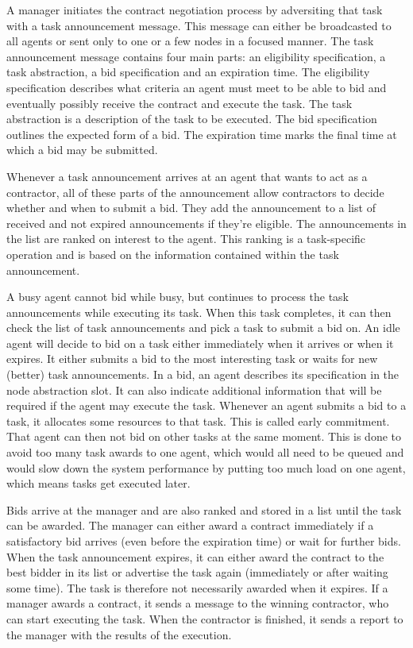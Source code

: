 \documentclass[10pt,a4paper,twocolumn]{article}
\begin{document}
A manager initiates the contract negotiation process by adversiting that task with a task announcement message. This message can either be broadcasted to all agents or sent only to one or a few nodes in a focused manner. The task announcement message contains four main parts: an eligibility specification, a task abstraction, a bid specification and an expiration time. The eligibility specification describes what criteria an agent must meet to be able to bid and eventually possibly receive the contract and execute the task. The task abstraction is a description of the task to be executed. The bid specification outlines the expected form of a bid. The expiration time marks the final time at which a bid may be submitted.

Whenever a task announcement arrives at an agent that wants to act as a contractor, all of these parts of the announcement allow contractors to decide whether and when to submit a bid. They add the announcement to a list of received and not expired announcements if they're eligible. The announcements in the list are ranked on interest to the agent. This ranking is a task-specific operation and is based on the information contained within the task announcement.

A busy agent cannot bid while busy, but continues to process the task announcements while executing its task. When this task completes, it can then check the list of task announcements and pick a task to submit a bid on. An idle agent will decide to bid on a task either immediately when it arrives or when it expires. It either submits a bid to the most interesting task or waits for new (better) task announcements. In a bid, an agent describes its specification in the node abstraction slot. It can also indicate additional information that will be required if the agent may execute the task. Whenever an agent submits a bid to a task, it allocates some resources to that task. This is called early commitment. That agent can then not bid on other tasks at the same moment. This is done to avoid too many task awards to one agent, which would all need to be queued and would slow down the system performance by putting too much load on one agent, which means tasks get executed later.

Bids arrive at the manager and are also ranked and stored in a list until the task can be awarded. The manager can either award a contract immediately if a satisfactory bid arrives (even before the expiration time) or wait for further bids. When the task announcement expires, it can either award the contract to the best bidder in its list or advertise the task again (immediately or after waiting some time). The task is therefore not necessarily awarded when it expires. If a manager awards a contract, it sends a message to the winning contractor, who can start executing the task. When the contractor is finished, it sends a report to the manager with the results of the execution.
\end{document}
